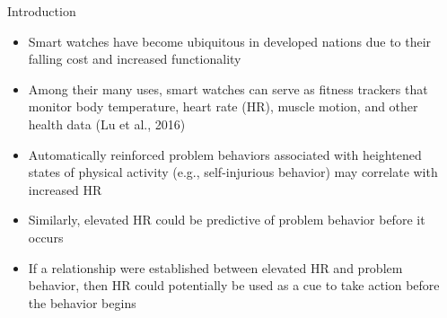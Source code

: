\documentclass[final]{beamer}
\newlength{\sepwid}
\newlength{\onecolwid}
\begin{document}
\setlength{\belowcaptionskip}{2ex} %
\setlength\belowdisplayshortskip{2ex} %

\begin{frame}[t] %

\begin{columns}[t] %

\begin{column}{\sepwid}\end{column} %

\begin{column}{\onecolwid} %


\begin{alertblock}{Introduction}
	
	\begin{itemize}
		\item Smart watches have become ubiquitous in developed nations due to their falling cost and increased functionality
		\item Among their many uses, smart watches can serve as fitness trackers that monitor body temperature, heart rate (HR), muscle motion, and other health data (Lu et al., 2016)
		\item Automatically reinforced problem behaviors associated with heightened states of physical activity (e.g., self-injurious behavior) may correlate with increased HR
		\item Similarly, elevated HR could be predictive of problem behavior before it occurs
		\item If a relationship were established between elevated HR and problem behavior, then HR could potentially be used as a cue to take action before the behavior begins
		
	\end{itemize}

\end{alertblock}



\end{column}
\end{columns}
\end{frame}
\end{document}
